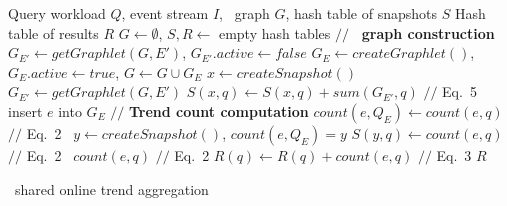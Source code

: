\begin{algorithm}[!ht]
\begin{algorithmic}[1]
\Require Query workload $Q$, event stream $I$, \app\ graph $G$, hash table of snapshots $S$
\Ensure Hash table of results $R$ 
\State $G \leftarrow \emptyset$, $S, R \leftarrow$ empty hash tables
    \State $//$ \textbf{\app\ graph construction}
            \State $G_{E'} \leftarrow \mathit{getGraphlet}(G,E')$,
            $G_{E'}.\mathit{active} \leftarrow \mathit{false}$
        \EndFor
    \EndFor
        \State $G_E \leftarrow \mathit{createGraphlet()}$, $G_{E}.\mathit{active} \leftarrow \mathit{true}$,
        $G \leftarrow G \cup G_E$
            $x \leftarrow \mathit{createSnapshot()}$ 
                    \State $G_{E'} \leftarrow \mathit{getGraphlet}(G,E')$
                    \State $S(x,q) \leftarrow S(x,q) + sum(G_{E'},q)$ \hspace{0.5cm}$//$ Eq.~5
                \EndFor
            \EndFor
        \EndIf    
    \EndIf
    \State insert $e$ into $G_E$
    \State $//$ \textbf{Trend count computation}
            \State $count(e,Q_E) \leftarrow count(e,q)$ \hspace{2.3cm}$//$ Eq.~2
        \Else\ $y \leftarrow \mathit{createSnapshot()}$, $count(e,Q_E) = y$
                $S(y,q) \leftarrow count(e,q)$ \hspace{0.2cm}$//$ Eq.~2
            \EndFor
          \EndIf
    \Else\ $count(e,q)$ \hspace{5.2cm}$//$ Eq.~2
    \EndIf
  		    $R(q) \leftarrow R(q) + count(e,q)$ $//$ Eq.~3
        \EndIf
    \EndFor
\EndFor
\State \Return $R$
\end{algorithmic}
\caption{\app\ shared online trend aggregation}
\label{algo:snapshot-propagation}
\end{algorithm}
